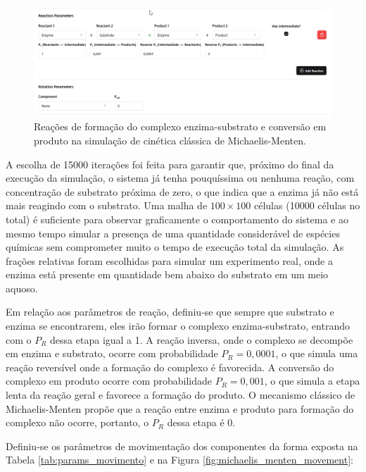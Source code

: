 \documentclass[12pt,oneside]{report}
\begin{document}
\begin{figure}[H]
    \centering
    \includegraphics[width=1\textwidth]{img/reaction_MM.png}
    \caption{\small Reações de formação do complexo enzima-substrato e conversão em produto na simulação de cinética clássica de Michaelis-Menten.}
    \label{fig:michaelis_menten_reaction}
\end{figure}

A escolha de 15000 iterações foi feita para garantir que, próximo do final da execução da simulação, o sistema já tenha pouquíssima ou nenhuma reação, com concentração de substrato próxima de zero, o que indica que a enzima já não está mais reagindo com o substrato. Uma malha de $100 \times 100$ células (10000 células no total) é suficiente para observar graficamente o comportamento do sistema e ao mesmo tempo simular a presença de uma quantidade considerável de espécies químicas sem comprometer muito o tempo de execução total da simulação. As frações relativas foram escolhidas para simular um experimento real, onde a enzima está presente em quantidade bem abaixo do substrato em um meio aquoso.

Em relação aos parâmetros de reação, definiu-se que sempre que substrato e enzima se encontrarem, eles irão formar o complexo enzima-substrato, entrando com o $P_R$ dessa etapa igual a 1. A reação inversa, onde o complexo se decompõe em enzima e substrato, ocorre com probabilidade $P_R = 0{,}0001$, o que simula uma reação reversível onde a formação do complexo é favorecida. A conversão do complexo em produto ocorre com probabilidade $P_R = 0{,}001$, o que simula a etapa lenta da reação geral e favorece a formação do produto. O mecanismo clássico de Michaelis-Menten propõe que a reação entre enzima e produto para formação do complexo não ocorre, portanto, o $P_R$ dessa etapa é 0.

Definiu-se os parâmetros de movimentação dos componentes da forma exposta na Tabela \ref{tab:params_movimento} e na Figura \ref{fig:michaelis_menten_movement}:
\end{document}
